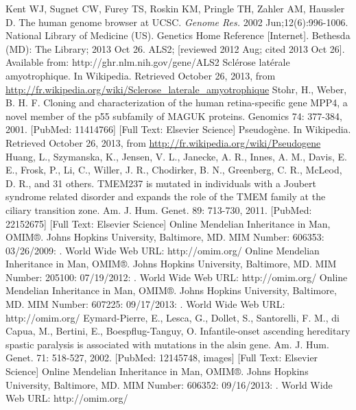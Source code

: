 \documentclass[11pt]{article} %
\begin{document}
%
%
\begin{thebibliography}{99}
    Kent WJ, Sugnet CW, Furey TS, Roskin KM, Pringle TH, Zahler AM, Haussler D. The human genome browser at UCSC. 
    \emph{Genome Res.} 2002 Jun;12(6):996-1006. 
    National Library of Medicine (US). Genetics Home Reference [Internet]. Bethesda (MD): The Library; 2013 Oct 26. ALS2; [reviewed 2012
    Aug; cited 2013 Oct 26]. Available from: http://ghr.nlm.nih.gov/gene/ALS2
  Sclérose latérale amyotrophique. In Wikipedia. Retrieved October 26, 2013, from
  \url{http://fr.wikipedia.org/wiki/Sclerose_laterale_amyotrophique}
  Stohr, H., Weber, B. H. F. Cloning and characterization of the human retina-specific gene MPP4, a novel member of the p55 subfamily of
  MAGUK proteins. Genomics 74: 377-384, 2001. [PubMed: 11414766] [Full Text: Elsevier Science]
  Pseudogène. In Wikipedia. Retrieved October 26, 2013, from \url{http://fr.wikipedia.org/wiki/Pseudogene}
  Huang, L., Szymanska, K., Jensen, V. L., Janecke, A. R., Innes, A. M., Davis, E. E., Frosk, P., Li, C., Willer, J. R., Chodirker, B. N.,
  Greenberg, C. R., McLeod, D. R., and 31 others. TMEM237 is mutated in individuals with a Joubert syndrome related disorder and expands
  the role of the TMEM family at the ciliary transition zone. Am. J. Hum. Genet. 89: 713-730, 2011. [PubMed: 22152675] [Full Text:
  Elsevier Science]
  Online Mendelian Inheritance in Man, OMIM®. Johns Hopkins University, Baltimore, MD. MIM Number: 606353: 03/26/2009: . 
  World Wide Web URL: http://omim.org/
  Online Mendelian Inheritance in Man, OMIM®. Johns Hopkins University, Baltimore, MD. MIM Number: 205100: 07/19/2012: . 
  World Wide Web URL: http://omim.org/
  Online Mendelian Inheritance in Man, OMIM®. Johns Hopkins University, Baltimore, MD. MIM Number: 607225: 09/17/2013: . 
  World Wide Web URL: http://omim.org/
  Eymard-Pierre, E., Lesca, G., Dollet, S., Santorelli, F. M., di Capua, M., Bertini, E., Boespflug-Tanguy, O. Infantile-onset ascending
  hereditary spastic paralysis is associated with mutations in the alsin gene. Am. J. Hum. Genet. 71: 518-527, 2002. [PubMed: 12145748,
  images] [Full Text: Elsevier Science]
  Online Mendelian Inheritance in Man, OMIM®. Johns Hopkins University, Baltimore, MD. MIM Number: 606352: 09/16/2013: . 
  World Wide Web URL: http://omim.org/

\end{thebibliography}
\end{document}
